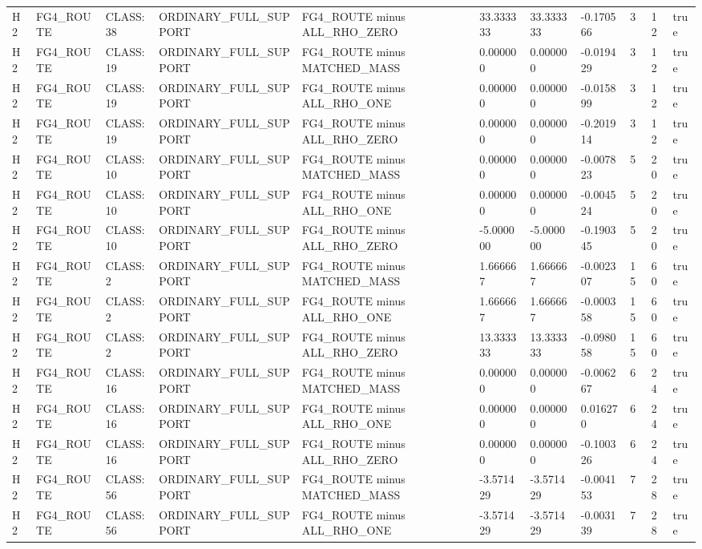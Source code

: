 \begin{tabular}{lllllllllll}
H2 & FG4\_ROUTE & CLASS:38 & ORDINARY\_FULL\_SUPPORT & FG4\_ROUTE minus ALL\_RHO\_ZERO & 33.333333 & 33.333333 & -0.170566 & 3 & 12 & true \\
H2 & FG4\_ROUTE & CLASS:19 & ORDINARY\_FULL\_SUPPORT & FG4\_ROUTE minus MATCHED\_MASS & 0.000000 & 0.000000 & -0.019429 & 3 & 12 & true \\
H2 & FG4\_ROUTE & CLASS:19 & ORDINARY\_FULL\_SUPPORT & FG4\_ROUTE minus ALL\_RHO\_ONE & 0.000000 & 0.000000 & -0.015899 & 3 & 12 & true \\
H2 & FG4\_ROUTE & CLASS:19 & ORDINARY\_FULL\_SUPPORT & FG4\_ROUTE minus ALL\_RHO\_ZERO & 0.000000 & 0.000000 & -0.201914 & 3 & 12 & true \\
H2 & FG4\_ROUTE & CLASS:10 & ORDINARY\_FULL\_SUPPORT & FG4\_ROUTE minus MATCHED\_MASS & 0.000000 & 0.000000 & -0.007823 & 5 & 20 & true \\
H2 & FG4\_ROUTE & CLASS:10 & ORDINARY\_FULL\_SUPPORT & FG4\_ROUTE minus ALL\_RHO\_ONE & 0.000000 & 0.000000 & -0.004524 & 5 & 20 & true \\
H2 & FG4\_ROUTE & CLASS:10 & ORDINARY\_FULL\_SUPPORT & FG4\_ROUTE minus ALL\_RHO\_ZERO & -5.000000 & -5.000000 & -0.190345 & 5 & 20 & true \\
H2 & FG4\_ROUTE & CLASS:2 & ORDINARY\_FULL\_SUPPORT & FG4\_ROUTE minus MATCHED\_MASS & 1.666667 & 1.666667 & -0.002307 & 15 & 60 & true \\
H2 & FG4\_ROUTE & CLASS:2 & ORDINARY\_FULL\_SUPPORT & FG4\_ROUTE minus ALL\_RHO\_ONE & 1.666667 & 1.666667 & -0.000358 & 15 & 60 & true \\
H2 & FG4\_ROUTE & CLASS:2 & ORDINARY\_FULL\_SUPPORT & FG4\_ROUTE minus ALL\_RHO\_ZERO & 13.333333 & 13.333333 & -0.098058 & 15 & 60 & true \\
H2 & FG4\_ROUTE & CLASS:16 & ORDINARY\_FULL\_SUPPORT & FG4\_ROUTE minus MATCHED\_MASS & 0.000000 & 0.000000 & -0.006267 & 6 & 24 & true \\
H2 & FG4\_ROUTE & CLASS:16 & ORDINARY\_FULL\_SUPPORT & FG4\_ROUTE minus ALL\_RHO\_ONE & 0.000000 & 0.000000 & 0.016270 & 6 & 24 & true \\
H2 & FG4\_ROUTE & CLASS:16 & ORDINARY\_FULL\_SUPPORT & FG4\_ROUTE minus ALL\_RHO\_ZERO & 0.000000 & 0.000000 & -0.100326 & 6 & 24 & true \\
H2 & FG4\_ROUTE & CLASS:56 & ORDINARY\_FULL\_SUPPORT & FG4\_ROUTE minus MATCHED\_MASS & -3.571429 & -3.571429 & -0.004153 & 7 & 28 & true \\
H2 & FG4\_ROUTE & CLASS:56 & ORDINARY\_FULL\_SUPPORT & FG4\_ROUTE minus ALL\_RHO\_ONE & -3.571429 & -3.571429 & -0.003139 & 7 & 28 & true \\

\end{tabular}
